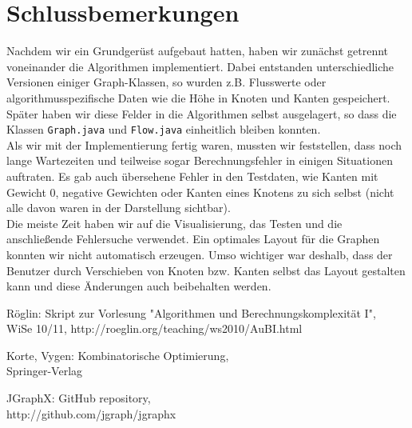 \documentclass{llncs}
\begin{document}
\section{Schlussbemerkungen}

Nachdem wir ein Grundgerüst aufgebaut hatten, haben wir zunächst getrennt voneinander die Algorithmen implementiert. Dabei entstanden unterschiedliche Versionen einiger Graph-Klassen, so wurden z.B. Flusswerte oder algorithmusspezifische Daten wie die Höhe in Knoten und Kanten gespeichert. Später haben wir diese Felder in die Algorithmen selbst ausgelagert, so dass die Klassen \texttt{Graph.java} und \texttt{Flow.java} einheitlich bleiben konnten. \\
Als wir mit der Implementierung fertig waren, mussten wir feststellen, dass noch lange Wartezeiten und teilweise sogar Berechnungsfehler in einigen Situationen auftraten. Es gab auch übersehene Fehler in den Testdaten, wie Kanten mit Gewicht 0, negative Gewichten oder Kanten eines Knotens zu sich selbst (nicht alle davon waren in der Darstellung sichtbar). \\
Die meiste Zeit haben wir auf die Visualisierung, das Testen und die anschließende Fehlersuche verwendet. 
Ein optimales Layout für die Graphen konnten wir nicht automatisch erzeugen. Umso wichtiger war deshalb, dass der Benutzer durch Verschieben von Knoten bzw. Kanten selbst das Layout gestalten kann und diese Änderungen auch beibehalten werden. 


\begin{thebibliography}{1}

 Röglin: Skript zur Vorlesung "Algorithmen und Berechnungskomplexität I",\\ WiSe 10/11, 
http://roeglin.org/teaching/ws2010/AuBI.html

 Korte, Vygen: Kombinatorische Optimierung, \\
Springer-Verlag

 JGraphX: GitHub repository, \\
http://github.com/jgraph/jgraphx 
\end{thebibliography}
\end{document}
